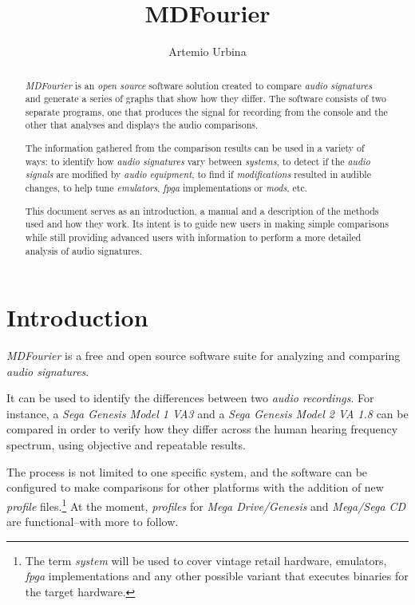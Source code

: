 \documentclass[10pt,a4paper]{report}
\title{MDFourier}
\author{Artemio Urbina}
\newcommand{\ac}[1]{\textit{\mbox{\acrshort{#1}}}}
\begin{document}
	
\begin{titlepage}
	\maketitle
	\thispagestyle{empty}
\end{titlepage}

\begin{abstract}
\textit{MDFourier} is an \textit{open source} software solution created to compare \textit{audio signatures} and generate a series of graphs that show how they differ. The software consists of two separate programs, one that produces the signal for recording from the console and the other that analyses and displays the audio comparisons. 

The information gathered from the comparison results can be used in a variety of ways: to identify how \textit{audio signatures} vary between \textit{systems}, to detect if the \textit{audio signals} are modified by \textit{audio equipment}, to find if \textit{modifications} resulted in audible changes, to help tune \textit{emulators}, \ac{fpga} implementations or \textit{mods}, etc.

This document serves as an introduction, a manual and a description of the methods used and how they work. Its intent is to guide new users in making simple comparisons while still providing advanced users with information to perform a more detailed analysis of audio signatures.
\end{abstract}

\tableofcontents

\chapter{Introduction}

\textit{MDFourier} is a free and open source software suite for analyzing and comparing \textit{audio signatures}.

It can be used to identify the differences between two \textit{audio recordings}. For instance, a \textit{Sega Genesis Model 1 VA3} and a \textit{Sega Genesis Model 2 VA 1.8} can be compared in order to verify how they differ across the human hearing frequency spectrum, using objective and repeatable results.

The process is not limited to one specific system, and the software can be configured to make comparisons for other platforms with the addition of new \textit{profile} files.\footnote{The term \textit{system} will be used to cover vintage retail hardware, emulators, \ac{fpga} implementations and any other possible variant that executes binaries for the target hardware.} At the moment, \textit{profiles} for \textit{Mega Drive/Genesis} and \textit{Mega/Sega CD} are functional--with more to follow.
\end{document}
